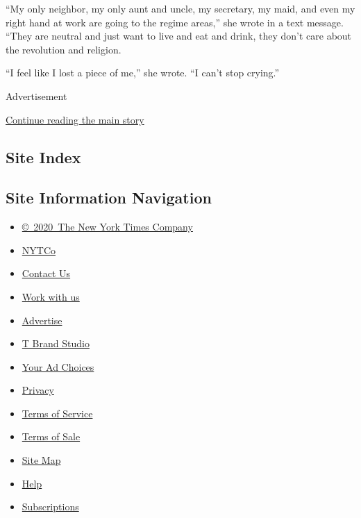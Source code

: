 ``My only neighbor, my only aunt and uncle, my secretary, my maid, and
even my right hand at work are going to the regime areas,'' she wrote in
a text message. ``They are neutral and just want to live and eat and
drink, they don't care about the revolution and religion.

``I feel like I lost a piece of me,'' she wrote. ``I can't stop
crying.''

Advertisement

\protect\hyperlink{after-bottom}{Continue reading the main story}

\hypertarget{site-index}{%
\subsection{Site Index}\label{site-index}}

\hypertarget{site-information-navigation}{%
\subsection{Site Information
Navigation}\label{site-information-navigation}}

\begin{itemize}
\tightlist
\item
  \href{https://help.nytimes3xbfgragh.onion/hc/en-us/articles/115014792127-Copyright-notice}{©~2020~The
  New York Times Company}
\end{itemize}

\begin{itemize}
\tightlist
\item
  \href{https://www.nytco.com/}{NYTCo}
\item
  \href{https://help.nytimes3xbfgragh.onion/hc/en-us/articles/115015385887-Contact-Us}{Contact
  Us}
\item
  \href{https://www.nytco.com/careers/}{Work with us}
\item
  \href{https://nytmediakit.com/}{Advertise}
\item
  \href{http://www.tbrandstudio.com/}{T Brand Studio}
\item
  \href{https://www.nytimes3xbfgragh.onion/privacy/cookie-policy\#how-do-i-manage-trackers}{Your
  Ad Choices}
\item
  \href{https://www.nytimes3xbfgragh.onion/privacy}{Privacy}
\item
  \href{https://help.nytimes3xbfgragh.onion/hc/en-us/articles/115014893428-Terms-of-service}{Terms
  of Service}
\item
  \href{https://help.nytimes3xbfgragh.onion/hc/en-us/articles/115014893968-Terms-of-sale}{Terms
  of Sale}
\item
  \href{https://spiderbites.nytimes3xbfgragh.onion}{Site Map}
\item
  \href{https://help.nytimes3xbfgragh.onion/hc/en-us}{Help}
\item
  \href{https://www.nytimes3xbfgragh.onion/subscription?campaignId=37WXW}{Subscriptions}
\end{itemize}
